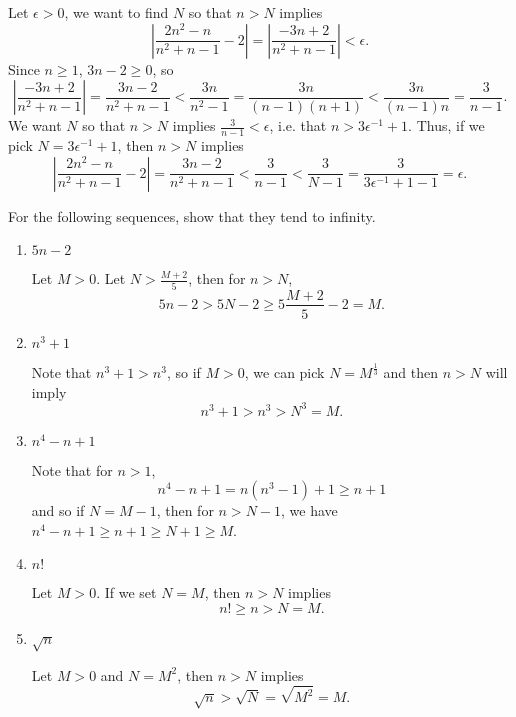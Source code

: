 \documentclass[11pt,dvipsnames]{book}
\numberwithin{figure}{section} %
\numberwithin{table}{section} %
\begin{document}
\begin{exercise}
\begin{enumerate}[label=(\alph*)]
\begin{solution}
Let $\epsilon>0$, we want to find $N$ so that $n> N$ implies
\[
\left|\frac{2n^{2}-n}{n^{2}+n-1}-2\right|
=\left|\frac{-3n+2}{n^2+n-1}\right|<\epsilon.
\]
Since $n\geq 1$, $3n-2\geq 0$, so
\[
\left|\frac{-3n+2}{n^2+n-1}\right|=\frac{3n-2}{n^2+n-1}
<\frac{3n}{n^2-1}=\frac{3n}{(n-1)(n+1)}<\frac{3n}{(n-1)n}=\frac{3}{n-1}.
\]
We want $N$ so that $n> N$ implies $\frac{3}{n-1}<\epsilon$, i.e. that $n>3\epsilon^{-1}+1$. Thus, if we pick $N=3\epsilon^{-1}+1$, then $n> N$ implies
\[
\left|\frac{2n^{2}-n}{n^{2}+n-1}-2\right|=\frac{3n-2}{n^2+n-1}<\frac{3}{n-1}< \frac{3}{N-1} =\frac{3}{3\epsilon^{-1}+1-1}=\epsilon.
\]

\end{solution}

\end{enumerate}

 \end{exercise}

 \begin{exercise}
 For the following sequences, show that they tend to infinity.

\begin{enumerate}[label=(\alph*)]
\item $5n-2$
\begin{solution}
Let $M>0$. Let $N>\frac{M+2}{5}$, then for $n> N$,
\[
5n-2> 5N-2\geq 5\frac{M+2}{5}-2=M.
\]
\end{solution}
\item $n^{3}+1$
\begin{solution}
Note that $n^3+1>n^3$, so if $M>0$, we can pick $N=M^{\frac{1}{3}}$ and then $n> N$ will imply
\[
n^3+1>n^3> N^3=M.
\]
\end{solution}
\item $n^{4}-n+1$
\begin{solution}
Note that for $n>1$,
\[
n^4-n+1=n(n^3-1)+1\geq n+1
\]
and so if $N=M-1$, then for $n>N-1$, we have $n^4-n+1\geq n+1\geq N+1\geq M$.
\end{solution}
\item $n!$
\begin{solution}
Let $M>0$. If we set $N=M$, then $n> N$ implies
\[
n!\geq n> N=M.
\]
\end{solution}
\item $\sqrt{n}$
\begin{solution}
Let $M>0$ and $N=M^2$, then $n> N$ implies
\[
\sqrt{n}> \sqrt{N}=\sqrt{M^2}=M.
\]
\end{solution}
\end{enumerate}
\end{exercise}
\end{document}

